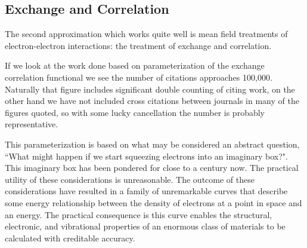 \subsection{Exchange and Correlation}
The second approximation which works quite well is mean field treatments of 
electron-electron interactions: the treatment of exchange and correlation. 

If we look at the work done based on parameterization of the exchange correlation functional 
we see the number of citations approaches 100,000. Naturally that figure includes significant 
double counting of citing work, on the other hand we have not included cross citations 
between journals in many of the figures quoted, so with some lucky 
cancellation the number is probably representative. 

This parameterization is based on what may be considered an abstract question,
``What might happen if we start squeezing electrons into an imaginary box?".
This imaginary box has been pondered for close to a century now. 
The practical utility of these considerations is unreasonable. 
The outcome of these considerations have resulted in a family of 
unremarkable curves that describe some energy relationship between
the density of electrons at a point in space and an energy. 
The practical consequence is this curve enables the
structural, electronic, and vibrational properties of an 
enormous class of materials to be calculated with creditable accuracy.
%
